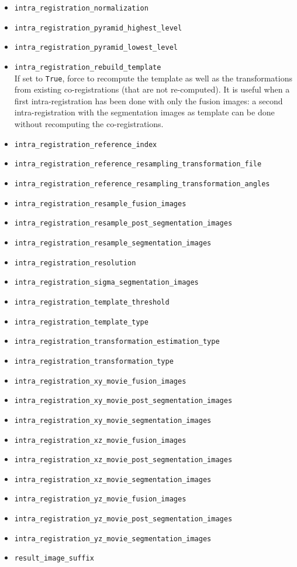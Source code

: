 \begin{itemize}
\item \texttt{intra\_registration\_normalization}
\item \texttt{intra\_registration\_pyramid\_highest\_level}
\item \texttt{intra\_registration\_pyramid\_lowest\_level}
\item \texttt{intra\_registration\_rebuild\_template}\\
  If set to \texttt{True}, force to recompute the template as well as the
  transformations from existing co-registrations (that are not
  re-computed). It is useful when a first intra-registration has been
  done with only the fusion images: a second intra-registration with
  the segmentation images as template can be done without recomputing the co-registrations.
\item \texttt{intra\_registration\_reference\_index}
\item \texttt{intra\_registration\_reference\_resampling\_transformation\_file}
\item \texttt{intra\_registration\_reference\_resampling\_transformation\_angles}
\item \texttt{intra\_registration\_resample\_fusion\_images}
\item \texttt{intra\_registration\_resample\_post\_segmentation\_images}
\item \texttt{intra\_registration\_resample\_segmentation\_images}
\item \texttt{intra\_registration\_resolution}
\item \texttt{intra\_registration\_sigma\_segmentation\_images}
\item \texttt{intra\_registration\_template\_threshold}
\item \texttt{intra\_registration\_template\_type}
\item \texttt{intra\_registration\_transformation\_estimation\_type}
\item \texttt{intra\_registration\_transformation\_type}
\item \texttt{intra\_registration\_xy\_movie\_fusion\_images}
\item \texttt{intra\_registration\_xy\_movie\_post\_segmentation\_images}
\item \texttt{intra\_registration\_xy\_movie\_segmentation\_images}
\item \texttt{intra\_registration\_xz\_movie\_fusion\_images}
\item \texttt{intra\_registration\_xz\_movie\_post\_segmentation\_images}
\item \texttt{intra\_registration\_xz\_movie\_segmentation\_images}
\item \texttt{intra\_registration\_yz\_movie\_fusion\_images}
\item \texttt{intra\_registration\_yz\_movie\_post\_segmentation\_images}
\item \texttt{intra\_registration\_yz\_movie\_segmentation\_images}
\item \texttt{result\_image\_suffix}
\end{itemize}
